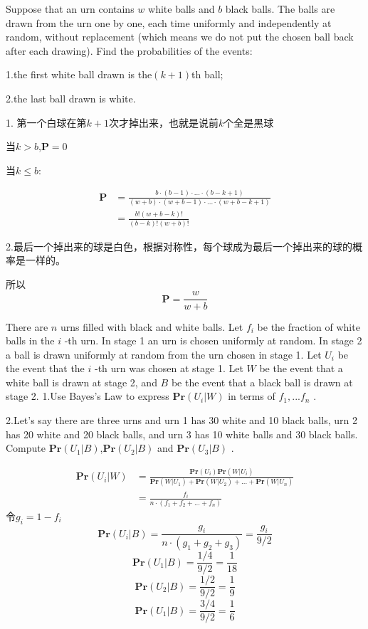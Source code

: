 \documentclass[12pt, a4paper, oneside]{ctexart}
\begin{document}
\begin{problem}
 Suppose that an urn contains $w$
white balls and $b$
black balls. The balls are drawn from the urn one by one, each time uniformly and independently at random, without replacement (which means we do not put the chosen ball back after each drawing). Find the probabilities of the events:

1.the first white ball drawn is the$(k+1)$th ball;

2.the last ball drawn is white.
\end{problem}
\begin{solution}
  1. 第一个白球在第$k+1$次才掉出来，也就是说前$k$个全是黑球

  当$k>b$,$\textbf{P} = 0$

  当$k \leq b$:

  $$
    \begin{aligned}
      \textbf{P} & = \frac{b\cdot (b-1) \cdot ... \cdot (b-k+1)}{(w+b) \cdot (w+b-1) \cdot ... \cdot (w+b-k+1)} \\
                 & =\frac{b!(w+b-k)!}{(b-k)!(w+b)!}
    \end{aligned}$$

  2.最后一个掉出来的球是白色，根据对称性，每个球成为最后一个掉出来的球的概率是一样的。

  所以$$\textbf{P} = \frac{w}{w+b}$$
\end{solution}
\begin{problem}
There are $n$
urns filled with black and white balls. Let $f_i$
be the fraction of white balls in the $i$
-th urn. In stage 1 an urn is chosen uniformly at random. In stage 2 a ball is drawn uniformly at random from the urn chosen in stage 1. Let $U_i$
be the event that the $i$
-th urn was chosen at stage 1. Let $W$
be the event that a white ball is drawn at stage 2, and $B$
be the event that a black ball is drawn at stage 2.
1.Use Bayes's Law to express $\textbf{Pr}(U_i|W)$
in terms of $f_1,...f_n$
.

2.Let's say there are three urns and urn 1 has 30 white and 10 black balls, urn 2 has 20 white and 20 black balls, and urn 3 has 10 white balls and 30 black balls. Compute $\textbf{Pr}(U_1|B)$,$\textbf{Pr}(U_2|B)$
and $\textbf{Pr}(U_3|B)$
.
\end{problem}
\begin{solution}
  $$
    \begin{aligned}
      \textbf{Pr}(U_i|W) & =\frac{\textbf{Pr}(U_i)\textbf{Pr}(W|U_i)}{\textbf{Pr}(W|U_1)+\textbf{Pr}(W|U_2)+...+\textbf{Pr}(W|U_n)} \\
                         & =\frac{f_i}{n\cdot(f_1+f_2+...+f_n)}
    \end{aligned}
  $$
  令$g_i = 1-f_i$
  $$
    \textbf{Pr}(U_i|B) = \frac{g_i}{n\cdot(g_1+g_2+g_3)}=\frac{g_i}{9/2}$$
  $$\textbf{Pr}(U_1|B) = \frac{1/4}{9/2} = \frac{1}{18}$$
  $$\textbf{Pr}(U_2|B) = \frac{1/2}{9/2} = \frac{1}{9}$$
  $$\textbf{Pr}(U_1|B) = \frac{3/4}{9/2} = \frac{1}{6}$$
\end{solution}
\end{document}
